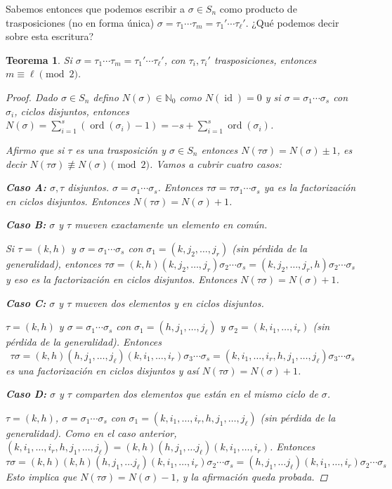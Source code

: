\documentclass[12pt]{book}
\newtheorem{teo}{Teorema}[section]
\theoremstyle{definition}
\newcommand{\NN}{\mathbb{N}}
\DeclareMathOperator{\id}{id}
\DeclareMathOperator{\ord}{ord}
\begin{document}
Sabemos entonces que podemos escribir a $\sigma \in S_n$ como producto de trasposiciones (no en forma única) $\sigma = \tau_1\cdots \tau_m = \tau_1'\cdots \tau_{\ell}'$. ¿Qué podemos decir sobre esta escritura?

\begin{teo}
Si $\sigma = \tau_1\cdots \tau_m = \tau_1'\cdots \tau_\ell'$, con $\tau_i,\tau_i'$ trasposiciones, entonces $m\equiv \ell\pmod{2}$.

\begin{proof}
Dado $\sigma\in S_n$ defino $N(\sigma) \in \NN_0$ como $N(\id)=0$ y si $\sigma =\sigma_1\cdots \sigma_s$ con $\sigma_i$, ciclos disjuntos, entonces $N(\sigma)=\sum_{i=1}^{s}(\ord(\sigma_i)-1) = -s + \sum_{i=1}^s \ord(\sigma_i)$.

Afirmo que si $\tau$ es una trasposición y $\sigma\in S_n$ entonces $N(\tau\sigma) = N(\sigma)\pm 1$, es decir $N(\tau\sigma)\not\equiv N(\sigma)\pmod{2}$. Vamos a cubrir cuatro casos:

\textbf{Caso A:} $\sigma, \tau$ disjuntos. $\sigma = \sigma_1\cdots \sigma_s$. Entonces $\tau\sigma = \tau\sigma_1\cdots \sigma_s$ ya es la factorización en ciclos disjuntos. Entonces $N(\tau\sigma) = N(\sigma)+1$.

\textbf{Caso B:} $\sigma$ y $\tau$ mueven exactamente un elemento en común.

Si $\tau = (k, h)$ y $\sigma = \sigma_1\cdots \sigma_s$ con $\sigma_1 = (k,j_2,\ldots , j_r)$ (sin pérdida de la generalidad), entonces $\tau\sigma = (k,h)(k,j_2,\ldots , j_r)\sigma_2\cdots \sigma_s = (k,j_2,\ldots , j_r,h)\sigma_2\cdots \sigma_s$ y eso es la factorización en ciclos disjuntos. Entonces $N(\tau\sigma) = N(\sigma)+1$.

\textbf{Caso C:} $\sigma$ y $\tau$ mueven dos elementos y en ciclos disjuntos.

$\tau = (k,h)$ y $\sigma = \sigma_1\cdots \sigma_s$ con $\sigma_1 = (h,j_1,\ldots , j_\ell)$ y $\sigma_2=(k,i_1,\ldots, i_r)$ (sin pérdida de la generalidad). Entonces $$\tau\sigma = (k,h)(h,j_1,\ldots , j_\ell)(k,i_1,\ldots ,i_r)\sigma_3\cdots\sigma_s = (k,i_1,\ldots , i_r,h,j_1,\ldots ,j_\ell)\sigma_3\cdots \sigma_s$$ es una factorización en ciclos disjuntos y así $N(\tau\sigma)=N(\sigma)+1$.

\textbf{Caso D:} $\sigma$ y $\tau$ comparten dos elementos que están en el mismo ciclo de $\sigma$.

$\tau = (k,h)$, $\sigma = \sigma_1\cdots \sigma_s$ con $\sigma_1 = (k,i_1,\ldots , i_r,h,j_1,\ldots , j_\ell)$ (sin pérdida de la generalidad). Como en el caso anterior, $(k,i_1,\ldots , i_r,h,j_1,\ldots , j_\ell) = (k,h)(h,j_1,\ldots j_\ell)(k,i_1,\ldots , i_r)$. Entonces $$\tau\sigma = (k,h)(k,h)(h,j_1,\ldots j_\ell)(k,i_1,\ldots , i_r)\sigma_2\cdots\sigma_s = (h,j_1,\ldots j_\ell)(k,i_1,\ldots , i_r)\sigma_2\cdots \sigma_s$$ Esto implica que $N(\tau\sigma) = N(\sigma)-1$, y la afirmación queda probada.


\end{proof}
\end{teo}
\end{document}
